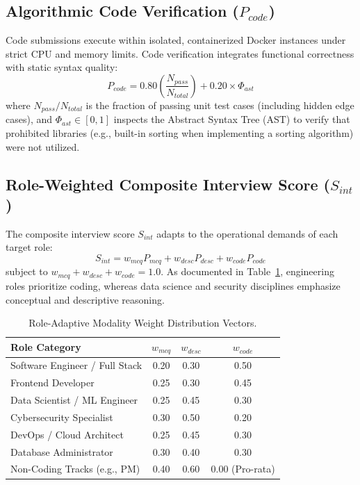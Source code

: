 \documentclass[conference]{IEEEtran}
\begin{document}
\subsection{Algorithmic Code Verification ($P_{code}$)}
Code submissions execute within isolated, containerized Docker instances under strict CPU and memory limits. Code verification integrates functional correctness with static syntax quality:
\begin{equation}
P_{code} = 0.80 \left(\frac{N_{pass}}{N_{total}}\right) + 0.20 \times \Phi_{ast}
\end{equation}
where $N_{pass} / N_{total}$ is the fraction of passing unit test cases (including hidden edge cases), and $\Phi_{ast} \in [0, 1]$ inspects the Abstract Syntax Tree (AST) to verify that prohibited libraries (e.g., built-in sorting when implementing a sorting algorithm) were not utilized.

\subsection{Role-Weighted Composite Interview Score ($S_{int}$)}
The composite interview score $S_{int}$ adapts to the operational demands of each target role:
\begin{equation}
S_{int} = w_{mcq} P_{mcq} + w_{desc} P_{desc} + w_{code} P_{code}
\end{equation}
subject to $w_{mcq} + w_{desc} + w_{code} = 1.0$. As documented in Table~\ref{tab:c2_weights}, engineering roles prioritize coding, whereas data science and security disciplines emphasize conceptual and descriptive reasoning.

\begin{table}[htbp]
\caption{Role-Adaptive Modality Weight Distribution Vectors.}
\begin{center}
\begin{tabular}{lccc}
\toprule
\textbf{Role Category} & \textbf{$w_{mcq}$} & \textbf{$w_{desc}$} & \textbf{$w_{code}$} \\
\midrule
Software Engineer / Full Stack   & 0.20 & 0.30 & 0.50 \\
Frontend Developer               & 0.25 & 0.30 & 0.45 \\
Data Scientist / ML Engineer     & 0.25 & 0.45 & 0.30 \\
Cybersecurity Specialist         & 0.30 & 0.50 & 0.20 \\
DevOps / Cloud Architect         & 0.25 & 0.45 & 0.30 \\
Database Administrator           & 0.30 & 0.40 & 0.30 \\
Non-Coding Tracks (e.g., PM)     & 0.40 & 0.60 & 0.00 (Pro-rata) \\
\bottomrule
\end{tabular}
\label{tab:c2_weights}
\end{center}
\end{table}
\end{document}
